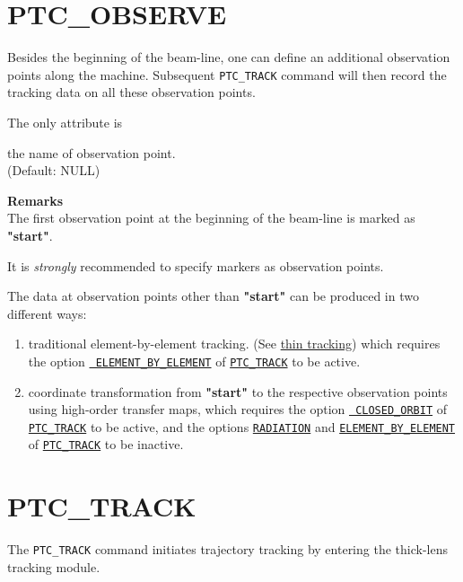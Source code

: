\section{PTC\_OBSERVE} 
\label{sec:ptc_observe}

Besides the beginning of the beam-line, one can define an additional
observation points along the machine. Subsequent \texttt{PTC\_TRACK}
command will then record the tracking data on all these observation
points.  


The only attribute is 
\begin{madlist}
   the name of observation point.  \\ (Default: NULL)
\end{madlist}


{\bf Remarks}\\
The first observation point at the beginning of the beam-line is marked
as {\bf "start"}.  
       
It is {\em strongly} recommended to specify markers as observation points.

The data at observation points other than {\bf "start"} can be produced
in two different ways:
\begin{enumerate}
  \item traditional element-by-element tracking. (See
    \hyperref[chap:thintrack]{\madx thin tracking}) which 
    requires the option \hyperref[opt:element_by_element]{\tt
      ELEMENT\_BY\_ELEMENT} of \hyperref[sec:ptc_track]{\tt PTC\_TRACK} to
    be active.

  \item coordinate transformation from {\bf "start"} to the
  respective observation points using high-order \ptc transfer
  maps, which requires the option \hyperref[opt:closed_orbit]{\tt
    CLOSED\_ORBIT} of \hyperref[sec:ptc_track]{\tt PTC\_TRACK} to be
  active, and the options \hyperref[opt:radiation]{\tt RADIATION}
  and \hyperref[opt:element_by_element]{\tt ELEMENT\_BY\_ELEMENT} of
  \hyperref[sec:ptc_track]{\tt PTC\_TRACK} to be inactive.
\end{enumerate} 


\section{PTC\_TRACK}
\label{sec:ptc_track}

The {\tt PTC\_TRACK} command initiates trajectory tracking by
entering the thick-lens tracking module.  

